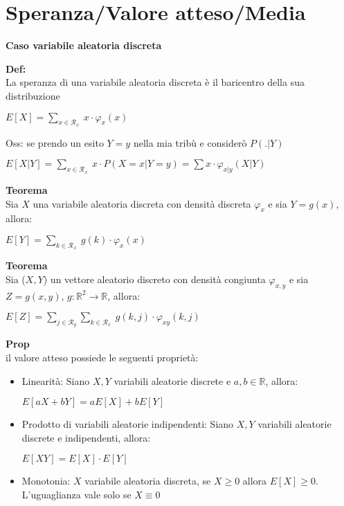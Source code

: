 \documentclass[12pt, a4paper]{article}
\begin{document}
\section{Speranza/Valore atteso/Media}
\begin{center}
    \textbf{Caso variabile aleatoria discreta}
\end{center}

\textbf{Def:}\\La speranza di una variabile aleatoria discreta è il baricentro della sua distribuzione
\begin{center}
    $E[X]=\sum_{x\in\mathcal{R}_{x}}\ x\cdot\varphi_{x}(x)$
\end{center}

Oss: se prendo un esito $Y=y$ nella mia tribù e considerò $P(.|Y)$
\begin{center}
    $E[X|Y]=\sum_{x\in\mathcal{R}_{x}}\ x\cdot P(X=x|Y=y)=\sum x\cdot\varphi_{x|y}(X|Y)$
\end{center}

\textbf{Teorema}\\Sia $X$ una variabile aleatoria discreta con densità discreta $\varphi_{x}$ e sia $Y=g(x)$, allora:
\begin{center}
    $E[Y]=\sum_{k\in\mathcal{R}_{x}}\ g(k)\cdot\varphi_{x}(x)$
\end{center}

\textbf{Teorema}\\Sia ($X,Y$) un vettore aleatorio discreto con densità congiunta $\varphi_{x,y}$ e sia $Z=g(x,y)$,
$g:\mathbb{R}^{2}\rightarrow\mathbb{R}$, allora:
\begin{center}
    $E[Z]=\sum_{j\in\mathcal{R}_{y}}\sum_{k\in\mathcal{R}_{x}}\ g(k,j)\cdot\varphi_{xy}(k,j)$
\end{center}

\newpage
\textbf{Prop}\\il valore atteso possiede le seguenti proprietà:
\begin{itemize}
    \item Linearità: Siano $X,Y$ variabili aleatorie discrete e $a,b\in\mathbb{R}$, allora:
    \begin{center}
        $E[aX+bY]=aE[X]+bE[Y]$
    \end{center}
    \item Prodotto di variabili aleatorie indipendenti: Siano $X,Y$ variabili aleatorie discrete e indipendenti, allora:
    \begin{center}
        $E[XY]=E[X]\cdot E[Y]$
    \end{center}
    \item Monotonia: $X$ variabile aleatoria discreta, se $X\geq 0$ allora $E[X]\geq 0$. L'uguaglianza vale solo se $X\equiv 0$
\end{itemize}
\end{document}
